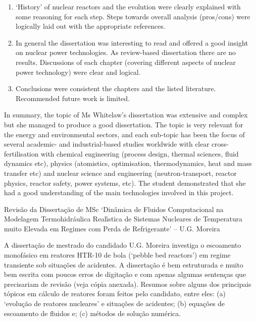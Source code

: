 \documentclass[14pt,twoside]{report}
\begin{document}
\begin{enumerate}
%
\item `History' of nuclear reactors and the evolution were clearly explained with some reasoning for each step. Steps towards overall analysis (pros/cons) were logically laid out with the appropriate references.
%
\item In general the dissertation was interesting to read and offered a good insight on nuclear power technologies. As review-based dissertation there are no results. Discussions of each chapter (covering different aspects of nuclear power technology) were clear and logical. 
%
\item Conclusions were consistent the chapters and the listed literature. Recommended future work is limited.
%
\end{enumerate}
In summary, the topic of Ms Whitelaw's dissertation was extensive and complex but she managed to produce a good dissertation. The topic is very relevant for the energy and environmental sectors, and each sub-topic has been the focus of several academic- and industrial-based studies worldwide with clear cross-fertilisation with chemical engineering (process design, thermal sciences, fluid dynamics etc), physics (atomistics, optimisation, thermodynamics, heat and mass transfer etc) and nuclear science and engineering (neutron-transport, reactor physics, reactor safety, power systems, etc). The student demonstrated that she had a good understanding of the main technologies involved in this project.


\clearpage




\bigskip

\begin{center}
  {\Large Revis\~ao da Disserta\c{c}\~ao de MSc `Din\^amica de Fluidos Computacional na Modelagem Termohidr\'aulica Real\'{\i}stica de Sistemas Nucleares de Temperatura muito Elevada em Regimes com Perda de Refrigerante' -- U.G. Moreira}
\end{center}

A disserta\c{c}\~ao de mestrado do candidado U.G. Moreira investiga o escoamento monof\'asico em reatores HTR-10 de bola (`pebble bed reactors') em regime transiente sob situa\c{c}\~oes de acidentes. A disserta\c{c}\~ao \'e bem estruturada e muito bem escrita com poucos erros de digita\c{c}\~ao e com apenas algumas senten\c{c}as que precisariam de revis\~ao (veja c\'opia anexada). Resumos sobre alguns dos principais t\'opicos em c\'alculo de reatores foram feitos pelo candidato, entre eles: (a) `evolu\c{c}\~ao de reatores nucleares' e situa\c{c}\~oes de acidentes; (b) equa\c{c}\~oes de escoamento de fluidos e; (c)  m\'etodos de solu\c{c}\~ao num\'erica.
\end{document}
